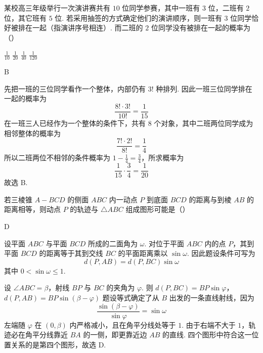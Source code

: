 \begin{problem}
某校高三年级举行一次演讲赛共有 \(10\) 位同学参赛，其中一班有 \(3\) 位，二班有 \(2\) 位，其它班有 \(5\) 位. 若采用抽签的方式确定他们的演讲顺序，则一班有 \(3\) 位同学恰好被排在一起（指演讲序号相连）. 而二班的 \(2\) 位同学没有被排在一起的概率为（\quad）

\choices
    {\(\frac{1}{10}\)}
    {\(\frac{1}{20}\)}
    {\(\frac{1}{40}\)}
    {\(\frac{1}{120}\)}
\end{problem}

\begin{answer}
B
\end{answer}

\begin{solution}
先把一班的三位同学看作一个整体，内部仍有 \(3!\) 种排列. 因此一班三位同学排在一起的概率为
\[
\frac{8!\cdot3!}{10!}=\frac{1}{15}\]
在一班三人已经作为一个整体的条件下，共有 \(8\) 个对象，其中二班两位同学成为相邻整体的概率为
\[
\frac{7!\cdot2!}{8!}=\frac{1}{4}\]
所以二班两位不相邻的条件概率为 \(1-\frac14=\frac34\)，所求概率为
\[
\frac{1}{15}\cdot\frac{3}{4}=\frac{1}{20}\]
故选 B.
\end{solution}

\begin{problem}
若三棱锥 \(A-BCD\) 的侧面 \(ABC\) 内一动点 \(P\) 到底面 \(BCD\) 的距离与到棱 \(AB\) 的距离相等，则动点 \(P\) 的轨迹与 \(\triangle ABC\) 组成图形可能是（\quad）

    {}
    {}
    {}
\end{problem}

\begin{answer}
D
\end{answer}

\begin{solution}
设平面 \(ABC\) 与平面 \(BCD\) 所成的二面角为 \(\omega\). 对位于平面 \(ABC\) 内的点 \(P\)，其到平面 \(BCD\) 的距离等于其到交线 \(BC\) 的平面距离乘以 \(\sin\omega\). 因此题设条件可写为
\[
d(P,AB)=d(P,BC)\sin\omega
\]
其中 \(0<\sin\omega\leqslant1\).

设 \(\angle ABC=\beta\)，射线 \(BP\) 与 \(BC\) 的夹角为 \(\varphi\). 则
\(d(P,BC)=BP\sin\varphi\)，\(d(P,AB)=BP\sin\left(\beta-\varphi\right)\)
题设等式确定了从 \(B\) 出发的一条直线射线，因为
\[
\frac{\sin\left(\beta-\varphi\right)}{\sin\varphi}=\sin\omega\]
左端随 \(\varphi\) 在 \(\left(0,\beta\right)\) 内严格减小，且在角平分线处等于 \(1\). 由于右端不大于 \(1\)，轨迹必在角平分线靠近 \(BA\) 的一侧，即更靠近边 \(AB\) 的直线. 四个图形中符合这一位置关系的是第四个图形，故选 D.
\end{solution}


